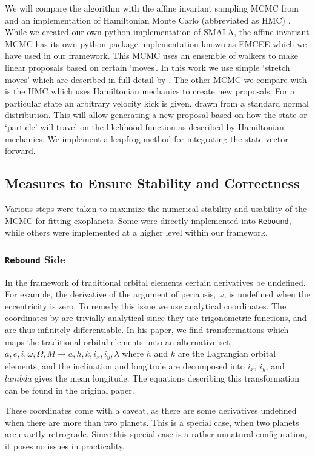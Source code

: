 \documentclass{aa}
\begin{document}
We will compare the algorithm with the affine invariant sampling MCMC from \cite{Foreman-Mackey2013} and an implementation of Hamiltonian Monte Carlo (abbreviated as HMC) \citep{Duane1987}. While we created our own python implementation of SMALA, the affine invariant MCMC has its own python package implementation known as EMCEE which we have used in our framework. This MCMC uses an ensemble of walkers to make linear proposals based on certain `moves'. In this work we use simple `stretch moves' which are described in full detail by \cite{Foreman-Mackey2013}. The other MCMC we compare with is the HMC which uses Hamiltonian mechanics to create new proposals. For a particular state an arbitrary velocity kick is given, drawn from a standard normal distribution. This will allow generating a new proposal based on how the state or `particle' will travel on the likelihood function as described by Hamiltonian mechanics. We implement a leapfrog method for integrating the state vector forward.

\subsection{Measures to Ensure Stability and Correctness}
Various steps were taken to maximize the numerical stability and usability of the MCMC for fitting exoplanets. Some were directly implemented into \texttt{Rebound}, while others were implemented at a higher level within our framework.

\subsubsection{\texttt{Rebound} Side}\label{analytical}
In the framework of traditional orbital elements certain derivatives be undefined. For example, the derivative of the argument of periapsis, $\omega$, is undefined when the eccentricity is zero. To remedy this issue we use analytical coordinates. The coordinates by \cite{Pl2009} are trivially analytical since they use trigonometric functions, and are thus infinitely differentiable. In his paper, we find transformations which maps the traditional orbital elements unto an alternative set, $a, e, i, \omega, \Omega, M \to a, h, k, i_x, i_y, \lambda$ where $h$ and $k$ are the Lagrangian orbital elements, and the inclination and longitude are decomposed into $i_x$, $i_y$, and $lambda$ gives the mean longitude. The equations describing this transformation  can be found in the original paper. 

These coordinates come with a caveat, as there are some derivatives undefined when there are more than two planets. This is a special case, when two planets are exactly retrograde. Since this special case is a rather unnatural configuration, it poses no issues in practicality.
\end{document}
